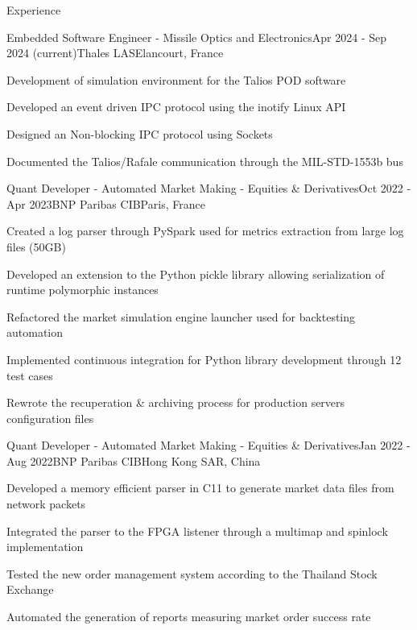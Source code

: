 \documentclass[
	a4paper, %
	10pt, %
]{resume} %
\def\CC{{C\nolinebreak[4]\hspace{-.05em}\raisebox{.4ex}{\tiny\bf ++}}}
\begin{document}
\begin{rSection}{Experience}

	\begin{rSubsection}{Embedded Software Engineer - Missile Optics and Electronics}{Apr 2024 - Sep 2024 (current)}{Thales LAS}{Elancourt, France}
		\item Development of simulation environment for the Talios POD software
    \item Developed an event driven IPC protocol using the inotify Linux API
    \item Designed an Non-blocking IPC protocol using Sockets
    \item Documented the Talios/Rafale communication through the MIL-STD-1553b bus
	\end{rSubsection}

	\begin{rSubsection}{Quant Developer - Automated Market Making - Equities \& Derivatives}{Oct 2022 - Apr 2023}{BNP Paribas CIB}{Paris, France}
		\item Created a log parser through PySpark used for metrics extraction from large log files (50GB)
		\item Developed an extension to the Python pickle library allowing serialization of runtime polymorphic instances
		\item Refactored the market simulation engine launcher used for backtesting automation
		\item Implemented continuous integration for Python library development through 12 test cases
		\item Rewrote the recuperation \& archiving process for production servers configuration files
	\end{rSubsection}

	\begin{rSubsection}{Quant Developer - Automated Market Making - Equities \& Derivatives}{Jan 2022 - Aug 2022}{BNP Paribas CIB}{Hong Kong SAR, China}
		\item Developed a memory efficient parser in \CC11 to generate market data files from network packets
		\item Integrated the parser to the FPGA listener through a multimap and spinlock implementation
		\item Tested the new order management system according to the Thailand Stock Exchange
		\item Automated the generation of reports measuring market order success rate
	\end{rSubsection}

\end{rSection}
\end{document}
